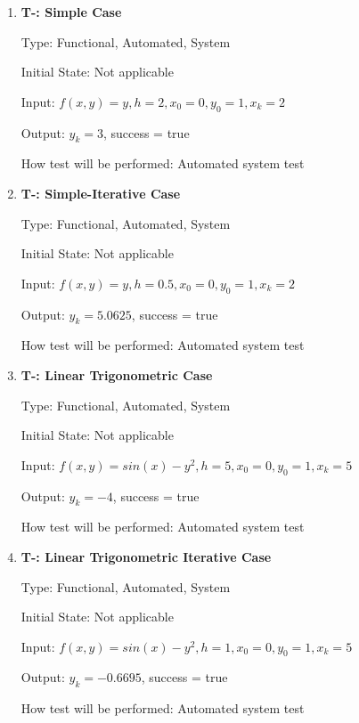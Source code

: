 \documentclass[12pt, titlepage]{article}
\newcounter{tnum} %
\begin{document}
\begin{enumerate}

\item{\textbf{T-\thetnum \label{t-euler_simple}: Simple Case}}

Type: Functional, Automated, System %
					
Initial State: Not applicable
					
Input: $f(x, y) = y, h = 2, x_0 = 0, y_0 = 1, x_k = 2$
					
Output: $y_k = 3$, success = true
					
How test will be performed: Automated system test  

\item{\textbf{T-\thetnum \label{t-euler_simpleiterative}: Simple-Iterative Case}}

Type: Functional, Automated, System %
					
Initial State: Not applicable
					
Input: $f(x, y) = y, h = 0.5, x_0 = 0, y_0 = 1, x_k = 2$
					
Output: $y_k = 5.0625$, success = true
					
How test will be performed: Automated system test

\item{\textbf{T-\thetnum \label{t-euler_nonlinear}: Linear Trigonometric Case}}

Type: Functional, Automated, System %
					
Initial State: Not applicable
					
Input: $f(x, y) = sin(x) - y^2, h = 5, x_0 = 0, y_0 = 1, x_k = 5$
					
Output: $y_k = -4$, success = true
					
How test will be performed: Automated system test

\item{\textbf{T-\thetnum \label{t-euler_nonlineariterative}: Linear Trigonometric Iterative Case}}

Type: Functional, Automated, System %
					
Initial State: Not applicable
					
Input: $f(x, y) = sin(x) - y^2, h = 1, x_0 = 0, y_0 = 1, x_k = 5$
					
Output: $y_k = -0.6695$, success = true
					
How test will be performed: Automated system test

\end{enumerate}
\end{document}
